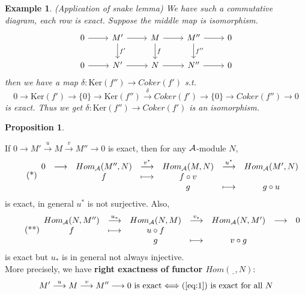 \documentclass[11pt]{article}
\newtheorem{prop}[thm]{Proposition}
\newtheorem{ex}[thm]{Example}
\newcommand{\cala}{{\cal A}}
\newcommand{\rta}{\rightarrow}
\newcommand{\lrta}{\longrightarrow}
\begin{document}
\begin{ex}
(Application of snake lemma) We have such a commutative diagram, each row is exact. Suppose the middle map is isomorphism. 
\[
\begin{tikzcd}
0\arrow[r]  & M'  \arrow[r]\arrow[d,"f'"] & M\arrow[r] \arrow[d,"f"] & M''\arrow[r] \arrow[d,"f''"] & 0 \\
0\arrow[r]  & N'  \arrow[r] & N\arrow[r] & N''\arrow[r]  & 0 
\end{tikzcd}
\]
then we have a map $\delta: \text{Ker}(f'')\lrta Coker(f')$ s.t.  
$$
0\lrta \text{Ker}(f')\lrta \{0\} \rta \text{Ker}(f'')\overset{\delta}{\lrta}Coker(f')\lrta \{0\}\lrta Coker(f'')\lrta 0 
$$
is exact. Thus we get $\delta:\text{Ker}(f'')\lrta Coker(f')$ is an isomorphism.
\end{ex}
\begin{prop}

\end{prop}
If $0\lrta M'\overset{u}{\lrta}M\overset{v}{\lrta}M'' \lrta0$  is exact, then for any $\cala$-module $N$,
\begin{equation}\label{eq:1}\tag{*}
\begin{array}{ c c c c c c c c c}
0 & \longrightarrow  & Hom_\cala(M'',N) & \overset{v^*}{\longrightarrow } & Hom_\cala(M,N) & \overset{u^*}{\longrightarrow } & Hom_\cala(M',N)  \\
 &  & f &\longmapsto  & f\circ v &  &   \\
 &  &  &  & g & \longmapsto & g\circ u 
\end{array}
\end{equation}
is exact, in general $u^*$ is not surjective. Also,
\begin{equation}\label{eq:2}\tag{**}
\begin{array}{ c c c c c c c c c}
  Hom_\cala(N,M'') & \overset{u_*}{\longrightarrow } & Hom_\cala(N,M) & \overset{v_*}{\longrightarrow } & Hom_\cala(N,M') & \longrightarrow  & 0\\
  f &\longmapsto  & u\circ f  &  &  &  & \\
   &  & g & \longmapsto & v\circ g &  &
\end{array}
\end{equation}
is exact but $u_*$ is in general not always injective.
\\
More precisely, we have \textbf{right exactness of functor $Hom(\underline{\ \ }, N)$}:\\
$$
M'\overset{u}{\lrta}M\overset{v}{\lrta}M'' \lrta0 \text{ is exact} \Longleftrightarrow (\ref{eq:1}) \text{ is exact for all $N$}
$$\\
\end{document}
